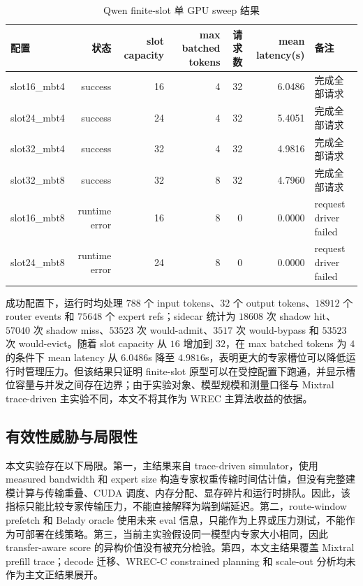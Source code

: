 \begin{table}[ht]
    \centering
    \caption{\label{tab:finite-slot-runtime}Qwen finite-slot 单 GPU sweep 结果}
    \begin{tabularx}{\linewidth}{lrrrrrX}
        \hline
        配置 & 状态 & slot capacity & max batched tokens & 请求数 & mean latency(s) & 备注 \\ \hline
        slot16\_mbt4 & success & 16 & 4 & 32 & 6.0486 & 完成全部请求 \\ \hline
        slot24\_mbt4 & success & 24 & 4 & 32 & 5.4051 & 完成全部请求 \\ \hline
        slot32\_mbt4 & success & 32 & 4 & 32 & 4.9816 & 完成全部请求 \\ \hline
        slot32\_mbt8 & success & 32 & 8 & 32 & 4.7960 & 完成全部请求 \\ \hline
        slot16\_mbt8 & runtime error & 16 & 8 & 0 & 0.0000 & request driver failed \\ \hline
        slot24\_mbt8 & runtime error & 24 & 8 & 0 & 0.0000 & request driver failed \\ \hline
    \end{tabularx}
\end{table}

成功配置下，运行时均处理 $788$ 个 input tokens、$32$ 个 output tokens、$18912$ 个 router events 和 $75648$ 个 expert refs；sidecar 统计为 $18608$ 次 shadow hit、$57040$ 次 shadow miss、$53523$ 次 would-admit、$3517$ 次 would-bypass 和 $53523$ 次 would-evict。随着 slot capacity 从 $16$ 增加到 $32$，在 max batched tokens 为 $4$ 的条件下 mean latency 从 $6.0486$s 降至 $4.9816$s，表明更大的专家槽位可以降低运行时管理压力。但该结果只证明 finite-slot 原型可以在受控配置下跑通，并显示槽位容量与并发之间存在边界；由于实验对象、模型规模和测量口径与 Mixtral trace-driven 主实验不同，本文不将其作为 WREC 主算法收益的依据。

\subsection{有效性威胁与局限性}

本文实验存在以下局限。第一，主结果来自 trace-driven simulator，使用 measured bandwidth 和 expert size 构造专家权重传输时间估计值，但没有完整建模计算与传输重叠、CUDA 调度、内存分配、显存碎片和运行时排队。因此，该指标只能比较专家传输压力，不能直接解释为端到端延迟。第二，route-window prefetch 和 Belady oracle 使用未来 eval 信息，只能作为上界或压力测试，不能作为可部署在线策略。第三，当前主实验假设同一模型内专家大小相同，因此 transfer-aware score 的异构价值没有被充分检验。第四，本文主结果覆盖 Mixtral prefill trace；decode 迁移、WREC-C constrained planning 和 scale-out 分析均未作为主文正结果展开。

